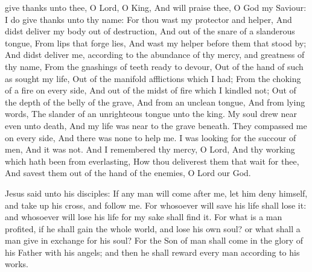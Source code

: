 give thanks unto thee, O Lord, O King, And will praise thee, O God my Saviour: I do give thanks unto thy name: For thou wast my protector and helper, And didst deliver my body out of destruction, And out of the snare of a slanderous tongue, From lips that forge lies, And wast my helper before them that stood by; And didst deliver me, according to the abundance of thy mercy, and greatness of thy name, From the gnashings of teeth ready to devour, Out of the hand of such as sought my life, Out of the manifold afflictions which I had; From the choking of a fire on every side, And out of the midst of fire which I kindled not; Out of the depth of the belly of the grave, And from an unclean tongue, And from lying words, The slander of an unrighteous tongue unto the king. My soul drew near even unto death, And my life was near to the grave beneath. They compassed me on every side, And there was none to help me. I was looking for the succour of men, And it was not. And I remembered thy mercy, O Lord, And thy working which hath been from everlasting, How thou deliverest them that wait for thee, And savest them out of the hand of the enemies, O Lord our God.



 Jesus said unto his disciples: If any man will come after me, let him deny himself, and take up his cross, and follow me. For whosoever will save his life shall lose it: and whosoever will lose his life for my sake shall find it. For what is a man profited, if he shall gain the whole world, and lose his own soul? or what shall a man give in exchange for his soul? For the Son of man shall come in the glory of his Father with his angels; and then he shall reward every man according to his works.

